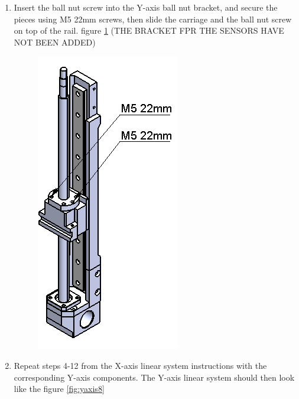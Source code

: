 \begin{enumerate}
\item Insert the ball nut screw into the Y-axis ball nut bracket, and secure the pieces using M5 22mm screws, then slide the carriage and the ball nut screw on top of the rail. figure \ref{fig:yaxis7} (THE BRACKET FPR THE SENSORS HAVE NOT BEEN ADDED)
    
\begin{figure}
    \centering
    \includegraphics[scale=0.6]{Platforms/figs/yaxis7.png}
    \caption{\label{fig:yaxis7}}
\end{figure}

\item Repeat steps 4-12 from the X-axis linear system instructions with the corresponding Y-axis components. The Y-axis linear system should then look like the figure \ref{fig:yaxis8}


\end{enumerate}
